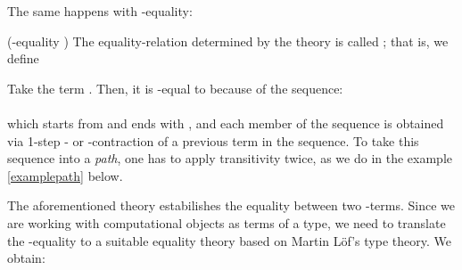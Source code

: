 \documentclass{entcs} \usepackage{entcsmacro}
\begin{document}
The same happens with -equality:\\ 
\begin{definition}(-equality \cite{lambda})
The equality-relation determined by the theory  is called
; that is, we define

\end{definition}

\begin{example}
Take the term . Then, it is -equal to  because of the sequence:\\
\\
which starts from  and ends with , and each member of the sequence is obtained via 1-step - or -contraction of a previous term in the sequence. To take this sequence into a {\em path\/}, one has to apply transitivity twice, as we do in the example \ref{examplepath} below.
\end{example}





The aforementioned theory estabilishes the equality between two -terms. Since we are working with computational objects as terms of a type, we need to translate the -equality to a suitable equality theory based on Martin L\"of's type theory. We obtain:
	
\end{document}
